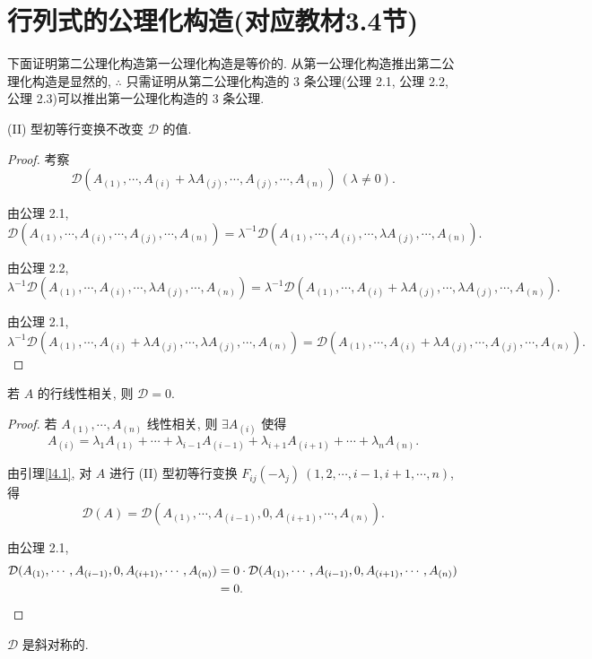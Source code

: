 \documentclass{ctexart}
\begin{document}
\section{行列式的公理化构造(对应教材3.4节)}
下面证明第二公理化构造第一公理化构造是等价的. 从第一公理化构造推出第二公理化构造是显然的, $\therefore$ 只需证明从第二公理化构造的 3 条公理(公理 2.1, 公理 2.2, 公理 2.3)可以推出第一公理化构造的 3 条公理.
\begin{lemma}\label{l4.1}
    (II) 型初等行变换不改变 $\mathcal{D}$ 的值.
\end{lemma}
\begin{proof}
    考察
    \[\mathcal{D}(A_{(1)},\cdots,A_{(i)}+\lambda A_{(j)},\cdots,A_{(j)},\cdots,A_{(n)})\ (\lambda\neq0).\]

    由公理 2.1,
    \[\mathcal{D}(A_{(1)},\cdots,A_{(i)},\cdots,A_{(j)},\cdots,A_{(n)})=\lambda^{-1}\mathcal{D}(A_{(1)},\cdots,A_{(i)},\cdots,\lambda A_{(j)},\cdots,A_{(n)}).\]

    由公理 2.2,
    \[\lambda^{-1}\mathcal{D}(A_{(1)},\cdots,A_{(i)},\cdots,\lambda A_{(j)},\cdots,A_{(n)})=\lambda^{-1}\mathcal{D}(A_{(1)},\cdots,A_{(i)}+\lambda A_{(j)},\cdots,\lambda A_{(j)},\cdots,A_{(n)}).\]

    由公理 2.1,
    \[\lambda^{-1}\mathcal{D}(A_{(1)},\cdots,A_{(i)}+\lambda A_{(j)},\cdots,\lambda A_{(j)},\cdots,A_{(n)})=\mathcal{D}(A_{(1)},\cdots,A_{(i)}+\lambda A_{(j)},\cdots,A_{(j)},\cdots,A_{(n)}).\]
\end{proof}
\begin{lemma}\label{l4.2}
    若 $A$ 的行线性相关, 则 $\mathcal{D}=0$.
\end{lemma}
\begin{proof}
    若 $A_{(1)},\cdots,A_{(n)}$ 线性相关, 则 $\exists A_{(i)}$ 使得
    \[A_{(i)}=\lambda_1A_{(1)}+\cdots+\lambda_{i-1}A_{(i-1)}+\lambda_{i+1}A_{(i+1)}+\cdots+\lambda_nA_{(n)}.\]

    由引理\ref{l4.1}, 对 $A$ 进行 (II) 型初等行变换 $F_{ij}(-\lambda_j)\ (1,2,\cdots,i-1,i+1,\cdots,n)$, 得
    \[\mathcal{D}(A)=\mathcal{D}(A_{(1)},\cdots,A_{(i-1)},0,A_{(i+1)},\cdots,A_{(n)}).\]

    由公理 2.1,
    \begin{align*}
        \mathcal{D}(A_{(1)},\cdots,A_{(i-1)},0,A_{(i+1)},\cdots,A_{(n)}) & =0\cdot\mathcal{D}(A_{(1)},\cdots,A_{(i-1)},0,A_{(i+1)},\cdots,A_{(n)}) \\
        & =0.\qedhere
    \end{align*}
\end{proof}
\begin{theorem}[公理 1.1]
    $\mathcal{D}$ 是斜对称的.
\end{theorem}
\end{document}
